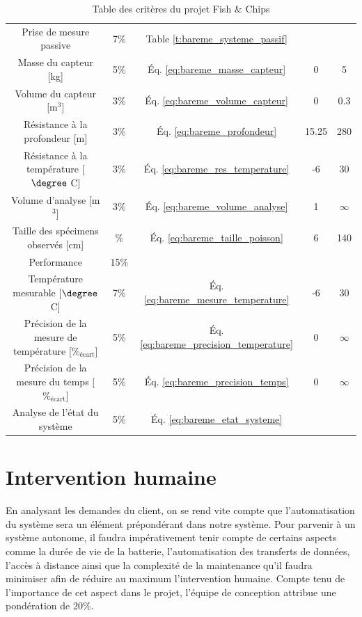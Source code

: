 \begin{table}[htp]
\begin{tabular}{|c|c|c|c|c|}
        \hline
        Prise de mesure passive & 7\% & Table \ref{t:bareme_systeme_passif} & & \\
        Masse du capteur [kg] & 5\% & Éq. \ref{eq:bareme_masse_capteur} & 0 & 5 \\
        Volume du capteur [m$^3$] & 3\% & Éq. \ref{eq:bareme_volume_capteur} & 0 & 0.3\\
        Résistance à la profondeur [m] & 3\% & Éq. \ref{eq:bareme_profondeur} & 15.25 & 280\\
        Résistance à la température [$\degree$ C] & 3\% & Éq. \ref{eq:bareme_res_temperature} & -6 & 30\\
        Volume d'analyse [m$^3$] & 3\% & Éq. \ref{eq:bareme_volume_analyse} & 1 & $\infty$\\
        Taille des spécimens observés [cm] & \% & Éq. \ref{eq:bareme_taille_poisson} & 6 & 140\\
        \hline
        \hline\hline
        Performance & 15\% & & & \\
        \hline
        Température mesurable [$\degree$ C] & 7\% & Éq. \ref{eq:bareme_mesure_temperature} & -6 & 30\\
        Précision de la mesure de température [$\%_\text{écart}$] & 5\% & Éq. \ref{eq:bareme_precision_temperature} & 0 & $\infty$ \\
        Précision de la mesure du temps [$\%_\text{écart}$] & 5\% & Éq. \ref{eq:bareme_precision_temps} & 0 & $\infty$ \\
        Analyse de l'état du système & 5\% & Éq. \ref{eq:bareme_etat_systeme} & & \\
        \hline
   \end{tabular}
      \caption{Table des critères du projet Fish \& Chips}
\end{table}



\newpage{}

\section{Intervention humaine}

En analysant les demandes du client, on se rend vite compte que l’automatisation du système sera un élément prépondérant dans notre système. Pour parvenir à un système autonome, il faudra impérativement tenir compte de certains aspects comme la  durée de vie de la batterie, l’automatisation des transferts de données, l’accès à distance ainsi que la complexité de la maintenance qu’il faudra minimiser afin de réduire au maximum l’intervention humaine. Compte tenu de l’importance de cet aspect dans le projet, l’équipe de conception attribue une pondération de 20\%.

